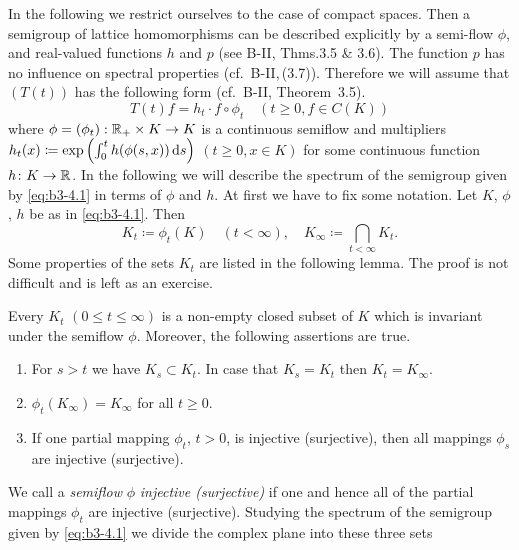 In the following we restrict ourselves to the case of compact spaces. 
Then a semigroup of lattice homomorphisms can be described explicitly by a semi-flow $\phi$, and real-valued functions $h$ and $p$ (see B-II, Thms.3.5 \& 3.6). The function $p$ has no influence on spectral properties (cf.\ B-II,\,(3.7)). 
Therefore we will assume that $(T(t))$ has the following form (cf.\ B-II, Theorem~3.5). 
\begin{equation}\label{eq:b3-4.1}
	T(t)f = h_{t}\cdot f\circ\phi_{t} \quad (t \geq 0, f \in C(K)) 
\end{equation}
where $\phi = (\phi_{t}): \mathbb{R}_{+} \times K \to K$ is a continuous semiflow and multipliers $h_{t}(x) \coloneq \exp\left(\int_{0}^{t} h(\phi(s,x)) \mathop{}\!\mathrm{d}{s}\right)$ $(t \geq 0, x \in K)$ for some continuous function $h \colon K \to \mathbb{R}$.
In the following we will describe the spectrum of the semigroup given by \eqref{eq:b3-4.1} in terms of $\phi$ and $h$.
At first we have to fix some notation.
Let $K$, $\phi$, $h$ be as in \eqref{eq:b3-4.1}. 
Then
\begin{equation}\label{eq:b3-4.2}
K_{t} \coloneq \phi_{t}(K) \quad (t < \infty), \quad K_{\infty} \coloneq \bigcap_{t < \infty} K_{t}.
\end{equation}
Some properties of the sets $K_t$  are listed in the following lemma.
The proof is not difficult and is left as an exercise. 
\begin{lemma}\label{lem:b3-4.2}
%
	Every $K_{t}$ $(0 \leq t \leq \infty)$ is a non-empty closed subset of $K$ which is invariant under the semiflow $\phi$.
	Moreover, the following assertions are true.
	\begin{enumerate}[\upshape (i)]
		\item 
		For $s > t$ we have $K_{s} \subset K_{t}$.
		In case that $K_{s} = K_{t}$ then $K_{t} = K_{\infty}$.
		
		\item
		$\phi_{t}(K_{\infty}) = K_{\infty}$ for all $t \geq 0$.
		
		\item 
		If one partial mapping $\phi_{t}$, $t > 0$, is injective (surjective), then all mappings $\phi_{s}$ are injective (surjective).
	\end{enumerate}
\end{lemma}
We call a \emph{semiflow} $\phi$ \emph{injective (surjective)} if one and hence all of the partial mappings $\phi_{t}$ are injective (surjective).
Studying the spectrum of the semigroup given by \eqref{eq:b3-4.1} we divide the complex plane into these three sets
